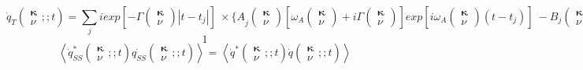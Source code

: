 \[{\dot{q}}_T\left( \begin{array}{c}
{\mathbf \kappa } \\ 
\nu  \end{array}
;;t\right)=\sum\limits_j{i{exp \left[-\Gamma \left( \begin{array}{c}
{\mathbf \kappa } \\ 
\nu  \end{array}
\right)\left|t-t_j\right|\right]\ }\times {\{A}_j\left( \begin{array}{c}
{\mathbf \kappa } \\ 
\nu  \end{array}
\right)\left[{\omega }_A\left( \begin{array}{c}
{\mathbf \kappa } \\ 
\nu  \end{array}
\right)+i\Gamma \left( \begin{array}{c}
{\mathbf \kappa } \\ 
\nu  \end{array}
\right)\right]{exp \left[i{\omega }_A\left( \begin{array}{c}
{\mathbf \kappa } \\ 
\nu  \end{array}
\right)\left(t-t_j\right)\right]\ }-B_j\left( \begin{array}{c}
{\mathbf \kappa } \\ 
\nu  \end{array}
\right){\left[{\omega }_A\left( \begin{array}{c}
{\mathbf \kappa } \\ 
\nu  \end{array}
\right)-i\Gamma \left( \begin{array}{c}
{\mathbf \kappa } \\ 
\nu  \end{array}
\right)\right]exp \left[-i{\omega }_A\left( \begin{array}{c}
{\mathbf \kappa } \\ 
\nu  \end{array}
\right)\left(t-t_j\right)\right]\ }\}}\] 
\[1\] 
\[\left\langle {\dot{q}}^*_{SS}\left( \begin{array}{c}
{\mathbf \kappa } \\ 
\nu  \end{array}
;;t\right)\dot{q_{SS}}\left( \begin{array}{c}
{\mathbf \kappa } \\ 
\nu  \end{array}
;;t\right)\right\rangle =\left\langle {\dot{q}}^*\left( \begin{array}{c}
{\mathbf \kappa } \\ 
\nu  \end{array}
;;t\right)\dot{q}\left( \begin{array}{c}
{\mathbf \kappa } \\ 
\nu  \end{array}
;;t\right)\right\rangle \] 
